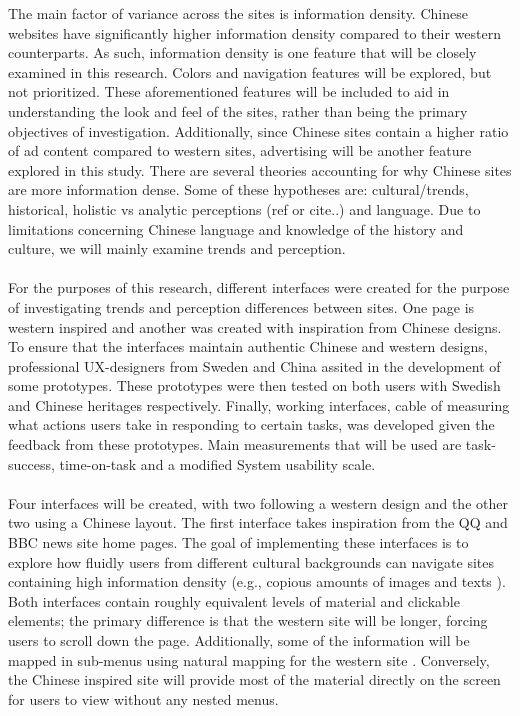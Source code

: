  The main factor of variance across the sites is information density. Chinese websites have significantly higher information density compared to their western counterparts. As such, information density is one feature that will be closely examined in this research. Colors and navigation features will be explored, but not prioritized. These aforementioned features will be included to aid in understanding the look and feel of the sites, rather than being the primary objectives of investigation. Additionally, since Chinese sites contain a higher ratio of ad content compared to western sites, advertising will be another feature explored in this study. There are several theories accounting for why Chinese sites are more information dense. Some of these hypotheses are: cultural/trends, historical, holistic vs analytic perceptions (ref or cite..) and language. Due to limitations concerning Chinese language and knowledge of the history and culture, we will mainly examine trends and perception.
 \\\\
For the purposes of this research, different interfaces were created for the purpose of investigating trends and perception differences between sites. One page is western inspired and another was created with inspiration from Chinese designs. To ensure that the interfaces maintain authentic Chinese and western designs, professional UX-designers from Sweden and China assited in the development of some prototypes. These prototypes were then tested on both users with Swedish and Chinese heritages respectively. Finally, working interfaces, cable of measuring what actions users take in responding to certain tasks, was developed given the feedback from these prototypes. Main measurements that will be used are task-success, time-on-task and a modified System usability scale. \cite{brooke1996sus} 
  \\\\
  Four interfaces will be created, with two following a western design and the other two using a Chinese layout. The first interface takes inspiration from the QQ and BBC news site home pages. The goal of implementing these interfaces is to explore how fluidly users from different cultural backgrounds can navigate sites containing high information density (e.g., copious amounts of images and texts ). Both interfaces contain roughly equivalent levels of material and clickable elements; the primary difference is that the western site will be longer, forcing users to scroll down the page. Additionally, some of the information will be mapped in sub-menus using natural mapping for the western site \cite{Norman}. Conversely, the Chinese inspired site will provide most of the material directly on the screen for users to view without any nested menus. 
